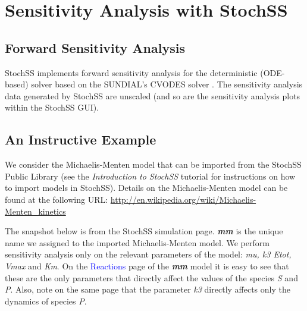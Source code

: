 \chapter{Sensitivity Analysis with StochSS}

%

\section{Forward Sensitivity Analysis}
StochSS implements forward sensitivity analysis for the deterministic (ODE-based) solver based on the SUNDIAL's CVODES solver \cite{sundials}. The sensitivity analysis data generated by StochSS are unscaled (and so are the sensitivity analysis plots within the StochSS GUI).

\section{An Instructive Example}
We consider the Michaelis-Menten model that can be imported from the StochSS Public Library (see the \textit{Introduction to StochSS} tutorial for instructions on how to import models in StochSS). Details on the Michaelis-Menten model can be found at the following URL: \url{http://en.wikipedia.org/wiki/Michaelis-Menten_kinetics}

The snapshot below is from the StochSS simulation page. \textbf{\textit{mm}} is the unique name we assigned to the imported Michaelis-Menten model. We perform sensitivity analysis only on the relevant parameters of the model: \textit{mu, k3 Etot, Vmax} and \textit{Km}. On the \textcolor{blue}{Reactions} page of the  \textbf{\textit{mm}}  model it is easy to see that these are the only parameters that directly affect the values of the species \textit{S} and \textit{P}. Also, note on the same page that the parameter \textit{k3} directly affects only the dynamics of species \textit{P}.

